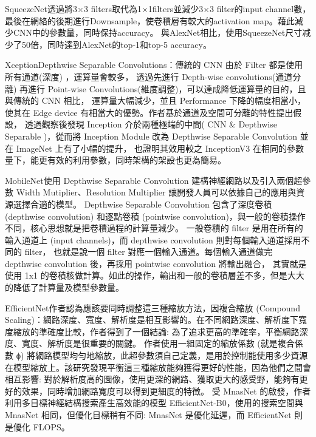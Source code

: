 \begin{flushleft}
  \hspace*{2em}SqueezeNet\cite{SqueezeNet}透過將3×3 filters取代為1×1filters並減少3×3 filter的input channel數，最後在網絡的後期進行Downsample，使卷積層有較大的activation map。藉此減少CNN中的參數量，同時保持accuracy。
  與AlexNet相比，使用SqueezeNet尺寸减少了50倍，同時達到AlexNet的top-1和top-5 accuracy。
  
  \hspace*{2em}Xception\cite{Xception}Depthwise Separable Convolutions：傳統的 CNN 由於 Filter 都是使用所有通道(深度) ，運算量會較多，
  透過先進行 Depth-wise convolutions(通道分離) 再進行 Point-wise Convolutions(維度調整)，可以達成降低運算量的目的，且與傳統的 CNN 相比，
  運算量大幅減少，並且 Performance 下降的幅度相當小，使其在 Edge device 有相當大的優勢。作者基於通道及空間可分離的特性提出假設，
  透過觀察後發現 Inception 介於兩種極端的中間( CNN \& Depthwise Separable )，從而將 Inception Module 改為 Depthwise Separable Convolution 並在 ImageNet 上有了小幅的提升，
  也證明其效用較之 InceptionV3 在相同的參數量下，能更有效的利用參數，同時架構的架設也更為簡易。

  \hspace*{2em}MobileNet\cite{MobileNet}使用 Depthwise Separable Convolution 建構神經網路以及引入兩個超參數 Width Mutiplier、Resolution Multiplier 讓開發人員可以依據自己的應用與資源選擇合適的模型。
  Depthwise Separable Convolution 包含了深度卷積 (depthwise convolution) 和逐點卷積 (pointwise convolution)，與一般的卷積操作不同，核心思想就是把卷積過程的計算量減少。
  一般卷積的 filter 是用在所有的輸入通道上 (input channels)，而 depthwise convolution 則對每個輸入通道採用不同的 filter，
  也就是說一個 filter 對應一個輸入通道。每個輸入通道做完 depthwise convolution 後，再採用 pointwise convolution 將輸出融合，
  其實就是使用 1x1 的卷積核做計算。如此的操作，輸出和一般的卷積層差不多，但是大大的降低了計算量及模型參數量。

  \hspace{2em}EfficientNet\cite{EfficientNet}作者認為應該要同時調整這三種縮放方法，因複合縮放 (Compound Scaling)：網路深度、寬度、解析度是相互影響的。在不同網路深度、解析度下寬度縮放的準確度比較，作者得到了一個結論: 為了追求更高的準確率，平衡網路深度、寬度、解析度是很重要的關鍵。
  作者使用一組固定的縮放係數 (就是複合係數 ϕ) 將網路模型均勻地縮放，此超參數須自己定義，是用於控制能使用多少資源在模型縮放上。該研究發現平衡這三種縮放能夠獲得更好的性能，因為他們之間會相互影響: 對於解析度高的圖像，使用更深的網路、獲取更大的感受野，能夠有更好的效果，同時增加網路寬度可以得到更細度的特徵。
  受 MnasNet 的啟發，作者利用多目標神經結構搜索產生高效能的模型 EfficientNet-B0，使用的搜索空間與 MnasNet 相同，但優化目標稍有不同: MnasNet 是優化延遲，而 EfficientNet 則是優化 FLOPS。


\end{flushleft}
